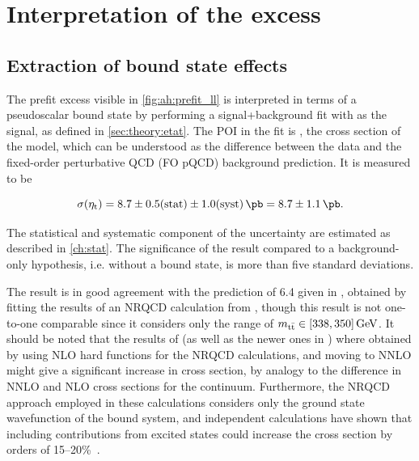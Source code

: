 
\section{Interpretation of the excess}
\label{sec:ah:excess}

\subsection{Extraction of \ttbartitle bound state effects}
\label{sec:ah:etat}

The prefit excess visible in \cref{fig:ah:prefit_ll} is interpreted in terms of a pseudoscalar \ttbar bound state by performing a signal+background fit with \etat as the signal, as defined in \cref{sec:theory:etat}. The POI in the fit is \sigetat, the cross section of the \etat model, which can be understood as the difference between the data and the fixed-order perturbative QCD (FO pQCD) background prediction. It is measured to be

\begin{equation}
    \sigetat = 8.7 \pm 0.5 (\text{stat}) \pm 1.0 (\text{syst}) \, \si{\pb} = 8.7 \pm 1.1  \, \si{\pb}.
\end{equation}

The statistical and systematic component of the uncertainty are estimated as described in \cref{ch:stat}. The significance of the result compared to a background-only hypothesis, i.e. without a bound state, is more than five standard deviations.

The result is in good agreement with the prediction of \SI{6.4}{\pb} given in , obtained by fitting the results of an NRQCD calculation from , though this result is not one-to-one comparable since it considers only the range of $\mtt \in [338, 350] \, \si{\GeV}$. It should be noted that the results of  (as well as the newer ones in )  where obtained by using NLO hard functions for the NRQCD calculations, and moving to NNLO might give a significant increase in cross section, by analogy to the difference in NNLO and NLO cross sections for the \ttbar continuum. Furthermore, the NRQCD approach employed in these calculations considers only the ground state wavefunction of the bound \ttbar system, and independent calculations have shown that including contributions from excited states could increase the cross section by orders of 15--20\%~\cite{Llanes-Estrada:2024phk,dEnterria:2025ecx}.

